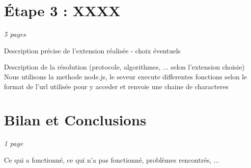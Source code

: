 \documentclass[a4paper]{article}
\begin{document}
\section{Étape 3 : XXXX}

\emph{5 pages}

Description précise de l'extension réalisée - choix éventuels

Description de la résolution (protocole, algorithmes, ... selon l'extension choisie)
Nous utilisons la methode node.js, le seveur execute differentes fonctions selon le format de l'url utilisée pour y acceder et renvoie une chaine de characteres\\

\section{Bilan et Conclusions}

\emph{1 page}

Ce qui a fonctionné, ce qui n'a pas fonctionné, problèmes rencontrés, ...
\end{document}
